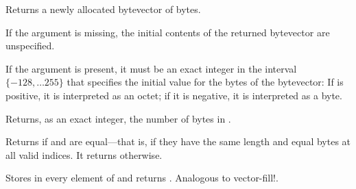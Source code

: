 \begin{entry}{%
}
   
Returns a newly allocated bytevector of  bytes.
   
If the  argument is missing, the initial contents of the
returned bytevector are unspecified.
   
If the  argument is present, it must be an exact integer in
the interval $\{-128, \ldots 255\}$ that specifies the initial value
for the bytes of the bytevector: If  is positive, it is
interpreted as an octet; if it is negative, it is interpreted as a byte.
\end{entry}   

\begin{entry}{%
}
   
Returns, as an exact integer, the number of bytes in .
\end{entry}

\begin{entry}{%
}
   
Returns \schtrue{} if  and  are equal---that
is, if they have the same length and equal bytes at all valid indices.
It returns \schfalse{} otherwise.
\end{entry}

\begin{entry}{%
}

Stores  in every element of 
and returns \unspecifiedreturn.  Analogous to {\cf vector-fill!}.
\end{entry}

